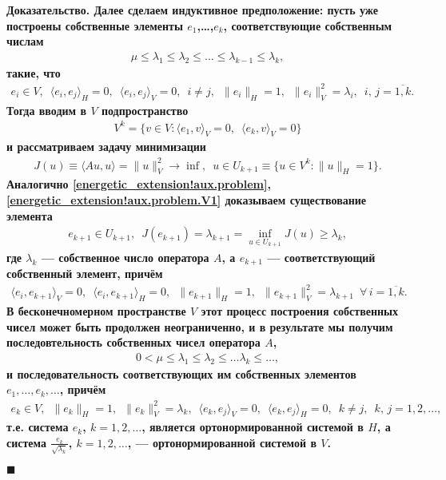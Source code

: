 \documentclass{report}
\newcounter{lem}[section]
\newenvironment{Proof}{\par\noindent\bf Доказательство.\rm}{ $\blacksquare$\par}
\begin{document}
\begin{Proof}
Далее сделаем индуктивное предположение: пусть уже построены собственные элементы $e_1$,\dots,$e_k$, соответствующие собственным числам
\begin{gather*}
\mu\leqslant\lambda_1\leqslant\lambda_2\leqslant\dots\leqslant\lambda_{k-1}\leqslant\lambda_k,
\end{gather*}
такие, что
\begin{gather*}
e_i\in V,\,\,\,\langle e_i,e_j\rangle_H=0,\,\,\,\langle e_i,e_j\rangle_V=0,\,\,\,i\neq j,\,\,\,\|e_i\|_H=1,\,\,\,\|e_i\|_V^2=\lambda_i,\,\,\,i,\,j=\overline{1,k}.
\end{gather*}
Тогда вводим в $V$ подпространство
\begin{gather*}
V^k=\{v\in V:\langle e_1,v\rangle_V=0,\,\,\,\langle e_k,v\rangle_V=0\}
\end{gather*}
и рассматриваем задачу минимизации
\begin{gather}\label{energetic_extension!aux.problem.Vk}
J(u)\equiv\langle Au,u\rangle=\|u\|_V^2\to\inf,\,\,\,u\in U_{k+1}\equiv\{u\in V^k:\|u\|_H=1\}.
\end{gather}
Аналогично \eqref{energetic_extension!aux.problem}, \eqref{energetic_extension!aux.problem.V1} доказываем существование элемента
\begin{gather*}
e_{k+1}\in U_{k+1},\,\,\,J(e_{k+1})=\lambda_{k+1}=\inf\limits_{u\in U_{k+1}}J(u)\geqslant\lambda_k,
\end{gather*}
где $\lambda_k$ --- собственное число оператора $A$, а $e_{k+1}$ --- соответствующий собственный элемент, причём
\begin{gather*}
\langle e_i,e_{k+1}\rangle_V=0,\,\,\,\langle e_i,e_{k+1}\rangle_H=0,\,\,\,\|e_{k+1}\|_H=1,\,\,\,\|e_{k+1}\|_V^2=\lambda_{k+1}\,\,\,\forall\,i=\overline{1,k}.
\end{gather*}
В бесконечномерном пространстве $V$ этот процесс построения собственных чисел может быть продолжен неограниченно, и в результате мы получим последовтельность собственных чисел оператора
$A$,
\begin{gather*}
0<\mu\leqslant\lambda_1\leqslant\lambda_2\leqslant\dots\lambda_k\leqslant\dots,
\end{gather*}
и последовательность соответствующих им собственных элементов $e_1,\dots,e_k,\dots$, причём
\begin{gather*}
e_k\in V,\,\,\,\|e_k\|_H=1,\,\,\,\|e_k\|^2_V=\lambda_k,\,\,\,\langle e_k,e_j\rangle_V=0,\,\,\,\langle e_k,e_j\rangle_H=0,\,\,\,k\neq j,\,\,\,k,\,j=1,2,\dots,
\end{gather*}
т.е. система $e_k$, $k=1,2,\dots$, является ортонормированной системой в $H$, а система $\frac{e_k}{\sqrt{\lambda_k}}$, $k=1,2,\dots$, --- ортонормированной системой в $V$.


\end{Proof}
\end{document}
